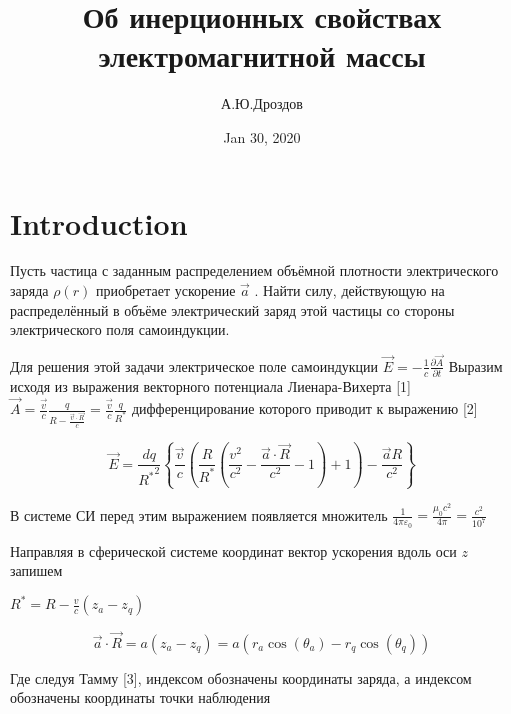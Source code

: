 \documentclass{article}
\begin{document}
\title{Об инерционных свойствах электромагнитной массы}

\author{А.Ю.Дроздов}

\date{Jan 30, 2020}



\section{Introduction}



Пусть частица с заданным распределением объёмной плотности электрического заряда $\rho \left( r \right)$ приобретает ускорение $\overrightarrow{a}$ . Найти силу, действующую на распределённый в объёме электрический заряд этой частицы со стороны электрического поля самоиндукции. 

Для решения этой задачи электрическое поле самоиндукции $\overrightarrow{E}=-\frac{1}{c}\frac{\partial \overrightarrow{A}}{\partial t}$ 
Выразим исходя из выражения векторного потенциала Лиенара-Вихерта [1] $\overrightarrow{A}=\frac{\overrightarrow{v}}{c}\frac{q}{R-\frac{\overrightarrow{v}\cdot \overrightarrow{R}}{c}}=\frac{\overrightarrow{v}}{c}\frac{q}{{{R}^{*}}}$ дифференцирование которого приводит к выражению [2]

\[\overrightarrow{E}=\frac{dq}{{{R}^{*}}^{2}}\left\{ \frac{\overrightarrow{v}}{c}\left( \frac{R}{{{R}^{*}}}\left( \frac{{{v}^{2}}}{{{c}^{2}}}-\frac{\overrightarrow{a}\cdot \overrightarrow{R}}{{{c}^{2}}}-1 \right)+1 \right)-\frac{\overrightarrow{a}R}{{{c}^{2}}} \right\}\] 

В системе СИ перед этим выражением появляется множитель $\frac{1}{4\pi {{\varepsilon }_{0}}}=\frac{{{\mu }_{0}}{{c}^{2}}}{4\pi }=\frac{{{c}^{2}}}{{{10}^{7}}}$ 

Направляя в сферической системе координат вектор ускорения вдоль оси $z$  запишем

${{R}^{*}}=R-\frac{v}{c}\left( {{z}_{a}}-{{z}_{q}} \right)$  

\[\overrightarrow{a}\cdot \overrightarrow{R}=a\left( {{z}_{a}}-{{z}_{q}} \right)=a\left( {{r}_{a}}\cos \left( {{\theta }_{a}} \right)-{{r}_{q}}\cos \left( {{\theta }_{q}} \right) \right)\]

Где следуя Тамму [3], индексом  обозначены координаты заряда, а индексом  обозначены координаты точки наблюдения

\end{document}
